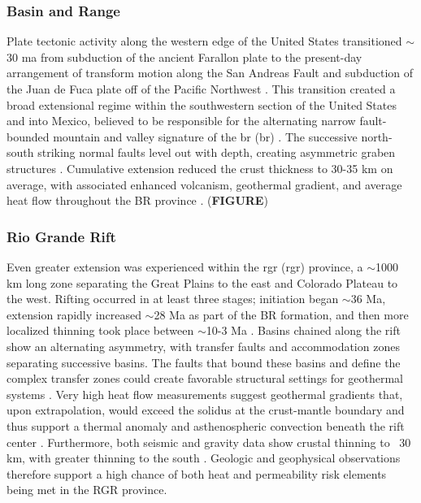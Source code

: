\subsubsection{Basin and Range}

Plate tectonic activity along the western edge of the United States transitioned $\sim$30 \acrshort{ma} from subduction of the ancient Farallon plate to the present-day arrangement of transform motion along the San Andreas Fault and subduction of the Juan de Fuca plate off of the Pacific Northwest \citep[p.\ 81]{fowler_solid_2005}. This transition created a broad extensional regime within the southwestern section of the United States and into Mexico, believed to be responsible for the alternating narrow fault-bounded mountain and valley signature of the \acrlong{br} (\acrshort{br}) \citep{henry_real_1992}. The successive north-south striking normal faults level out with depth, creating asymmetric graben structures \citep[p.\ 28-29]{frisch_continental_2011}. Cumulative extension reduced the crust thickness to 30-35 km on average, with associated enhanced volcanism, geothermal gradient, and average heat flow throughout the BR province \citep{lerch_crustal_2007}. (\textbf{FIGURE})

\subsubsection{Rio Grande Rift}

Even greater extension was experienced within the \acrlong{rgr} (\acrshort{rgr}) province, a $\sim$1000 km long zone separating the Great Plains to the east and Colorado Plateau to the west. Rifting occurred in at least three stages; initiation began $\sim$36 Ma, extension rapidly increased $\sim$28 Ma as part of the BR formation, and then more localized thinning took place between $\sim$10-3 Ma \citep{bielicki_hydrogeolgic_2015,mack_geology_2008,seager_new_1984}. Basins chained along the rift show an alternating asymmetry, with transfer faults and accommodation zones separating successive basins. The faults that bound these basins and define the complex transfer zones could create favorable structural settings for geothermal systems \citep{faulds_favorable_2015}. Very high heat flow measurements suggest geothermal gradients that, upon extrapolation, would exceed the solidus at the crust-mantle boundary and thus support a thermal anomaly and asthenospheric convection beneath the rift center \citep{olsen_rio_1987}. Furthermore, both seismic and gravity data show crustal thinning to ~30 km, with greater thinning to the south \citep{keller_rio_1999}. Geologic and geophysical observations therefore support a high chance of both heat and permeability risk elements being met in the RGR province. 

